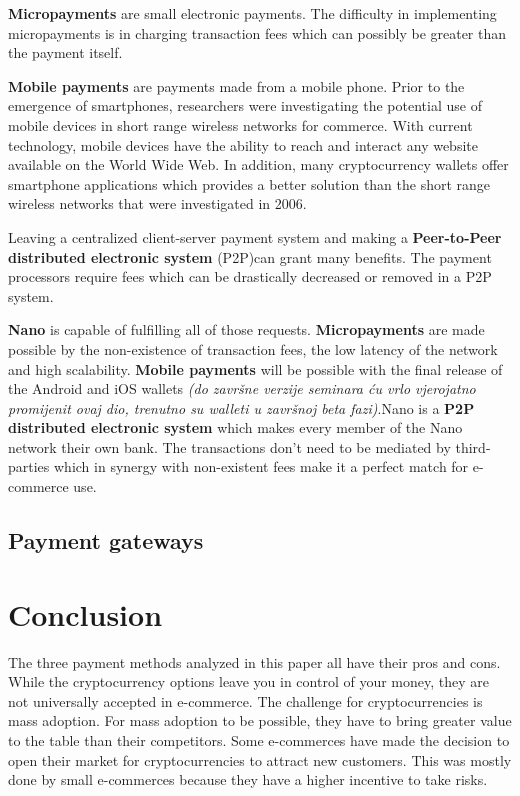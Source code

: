\documentclass{ferseminar}
\begin{document}
\textbf{Micropayments} are small electronic payments. The difficulty in implementing micropayments is in charging transaction fees which can possibly be greater than the payment itself.

\textbf{Mobile payments} are payments made from a mobile phone. Prior to the emergence of smartphones, researchers were investigating the potential use of mobile devices in short range wireless networks for commerce. With current technology, mobile devices have the ability to reach and interact any website available on the World Wide Web. In addition, many cryptocurrency wallets offer smartphone applications which provides a better solution than the short range wireless networks that were investigated in 2006.  

Leaving a centralized client-server payment system and making a \textbf{Peer-to-Peer distributed electronic system} (P2P)can grant many benefits. The payment processors require fees which can be drastically decreased or removed in a P2P system.

\textbf{Nano} is capable of fulfilling all of those requests. \textbf{Micropayments} are made possible by the non-existence of transaction fees, the low latency of the network and high scalability. \textbf{Mobile payments} will be possible with the final release of the Android and iOS wallets \textit{(do završne verzije seminara ću vrlo vjerojatno promijenit ovaj dio, trenutno su walleti u završnoj beta fazi)}.Nano is a \textbf{P2P distributed electronic system} which makes every member of the Nano network their own bank. The transactions don't need to be mediated by third-parties which in synergy with non-existent fees make it a perfect match for e-commerce use.
\subsection{Payment gateways}






\section{Conclusion}
The three payment methods analyzed in this paper all have their pros and cons. While the cryptocurrency options leave you in control of your money, they are not universally accepted in e-commerce. The challenge for cryptocurrencies is mass adoption. For mass adoption to be possible, they have to bring greater value to the table than their competitors. Some e-commerces have made the decision to open their market for cryptocurrencies to attract new customers. This was mostly done by small e-commerces because they have a higher incentive to take risks. 
\end{document}

